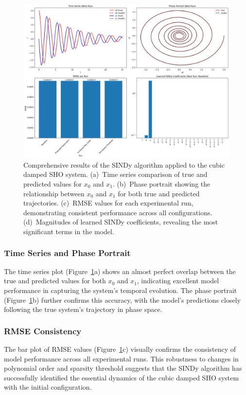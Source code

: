 \documentclass{article} %
\begin{document}
\begin{figure}[h]
    \centering
    \includegraphics[width=\textwidth]{results.png}
    \caption{Comprehensive results of the SINDy algorithm applied to the cubic damped SHO system. (a)~Time series comparison of true and predicted values for $x_0$ and $x_1$. (b)~Phase portrait showing the relationship between $x_0$ and $x_1$ for both true and predicted trajectories. (c)~RMSE values for each experimental run, demonstrating consistent performance across all configurations. (d)~Magnitudes of learned SINDy coefficients, revealing the most significant terms in the model.}
    \label{fig:results}
\end{figure}

\subsubsection{Time Series and Phase Portrait}
The time series plot (Figure~\ref{fig:results}a) shows an almost perfect overlap between the true and predicted values for both $x_0$ and $x_1$, indicating excellent model performance in capturing the system's temporal evolution. The phase portrait (Figure~\ref{fig:results}b) further confirms this accuracy, with the model's predictions closely following the true system's trajectory in phase space.

\subsubsection{RMSE Consistency}
The bar plot of RMSE values (Figure~\ref{fig:results}c) visually confirms the consistency of model performance across all experimental runs. This robustness to changes in polynomial order and sparsity threshold suggests that the SINDy algorithm has successfully identified the essential dynamics of the cubic damped SHO system with the initial configuration.
\end{document}
